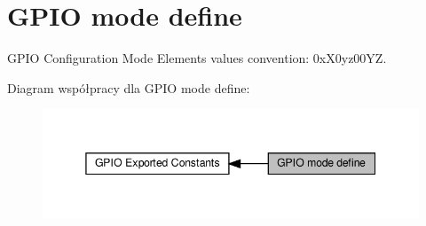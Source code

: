 \hypertarget{group___g_p_i_o__mode__define}{}\section{G\+P\+IO mode define}
\label{group___g_p_i_o__mode__define}


G\+P\+IO Configuration Mode Elements values convention\+: 0x\+X0yz00\+YZ.  


Diagram współpracy dla G\+P\+IO mode define\+:\nopagebreak
\begin{figure}[H]
\begin{center}
\leavevmode
\includegraphics[width=345pt]{group___g_p_i_o__mode__define}
\end{center}
\end{figure}
